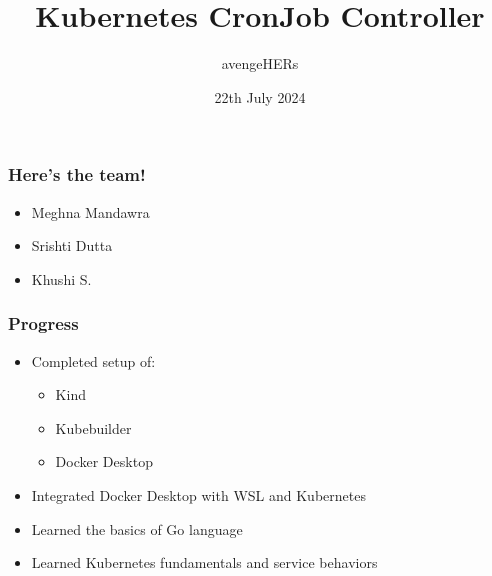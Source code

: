 \documentclass{beamer}
\title{Kubernetes CronJob Controller}
\author{avengeHERs}
\date{22th July 2024}
\begin{document}
\frame{\titlepage}

\begin{frame}
\frametitle{Here's the team!}

\begin{itemize}
    \item Meghna Mandawra
    \item Srishti Dutta
    \item Khushi S.
\end{itemize}

\end{frame}

\begin{frame}
    \frametitle{Progress}
\begin{itemize}
    \item Completed setup of:
    \begin{itemize}
        \item Kind 
        \item Kubebuilder 
        \item Docker Desktop
    \end{itemize}
    \item Integrated Docker Desktop with WSL and Kubernetes
    \item Learned the basics of Go language
    \item Learned Kubernetes fundamentals and service behaviors

\end{itemize}
\end{frame}
\end{document}
